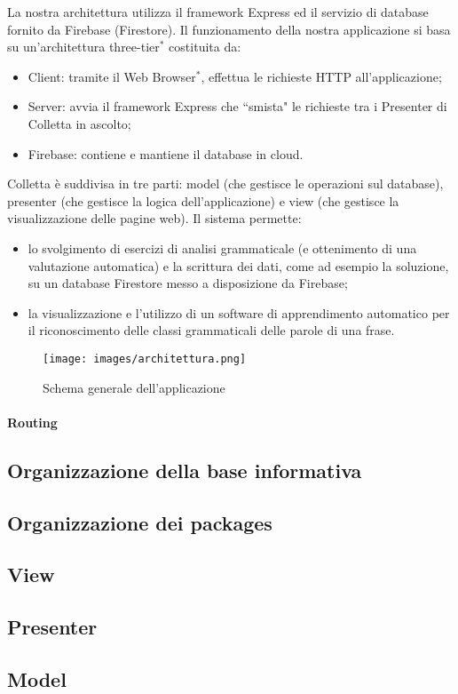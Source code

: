 La nostra architettura utilizza il framework Express ed il servizio di database fornito da Firebase (Firestore). Il funzionamento della nostra applicazione si basa su un'architettura three-tier$^{*}$ costituita da:
\begin{itemize}
	\item Client: tramite il Web Browser$^*$, effettua le richieste HTTP all'applicazione;
	\item Server: avvia il framework Express che ``smista" le richieste tra i Presenter di Colletta in ascolto;
	\item Firebase: contiene e mantiene il database in cloud.
\end{itemize}

Colletta è suddivisa in tre parti: model (che gestisce le operazioni sul database), presenter (che gestisce la logica dell'applicazione) e view (che gestisce la visualizzazione delle pagine web). Il sistema permette:
\begin{itemize}
	\item lo svolgimento di esercizi di analisi grammaticale (e ottenimento di una valutazione automatica) e la scrittura dei dati, come ad esempio la soluzione, su un database Firestore messo a disposizione da Firebase;
	\item la visualizzazione e l'utilizzo di un software di apprendimento automatico per il riconoscimento delle classi grammaticali delle parole di una frase.
\end{itemize}

\begin{figure}[h]
	\texttt{[image: images/architettura.png]}
	\caption{Schema generale dell'applicazione}
\end{figure}

\paragraph*{Routing\\}

\newpage

\subsection{Organizzazione della base informativa}

\newpage

\subsection{Organizzazione dei packages}

\newpage

\subsection{View}

\newpage
\subsection{Presenter}

\newpage
\subsection{Model}

\newpage